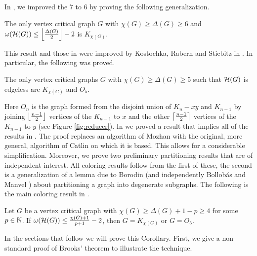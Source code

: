 In \cite{rabern2010a}, we improved the $7$ to $6$ by proving the following generalization.

\begin{thm}
The only vertex critical graph $G$ with $\chi(G) \geq \Delta(G) \geq 6$ and $\omega(\mathcal{H}(G)) \leq \left\lfloor\frac{\Delta(G)}{2}\right\rfloor - 2$ is $K_{\chi(G)}$.
\end{thm}

This result and those in \cite{rabern2010b} were improved by Kostochka, Rabern and Stiebitz in \cite{krs_one}.  In particular, the following was proved.

\begin{thm}\label{krs_one_main} The only vertex critical graphs $G$ with $\chi(G) \geq
\Delta(G) \geq 5$ such that $\mathcal{H}(G)$ is edgeless are $K_{\chi(G)}$ and $O_5$.
\end{thm}



Here $O_n$ is the graph formed from the disjoint union of $K_n - xy$ and
$K_{n-1}$ by joining $\left\lfloor\frac{n-1}{2}\right\rfloor$ vertices of the $K_{n-1}$ to $x$
and the other $\left\lceil\frac{n-1}{2}\right\rceil$ vertices of the $K_{n-1}$ to $y$ (see
Figure \ref{fig:reducer}). In \cite{rabern2012partitioning} we proved a result that implies all of the results in \cite{krs_one}. The proof replaces an algorithm of Mozhan \cite{mozhan1983} with the original, more general, algorithm of Catlin \cite{CatlinAnotherBound} on which it is based. This allows for a considerable simplification.   Moreover, we prove two preliminary partitioning results that are of independent interest.  
All coloring results follow from the first of these, the second is a generalization of a lemma due to Borodin \cite{borodin1976decomposition} (and independently Bollob\'as and Manvel \cite{bollobasManvel})
about partitioning a graph into degenerate subgraphs.  The following is the main
coloring result in \cite{rabern2012partitioning}.

\begin{cor}\label{MainShuffleColoringResult}
	Let $G$ be a vertex critical graph with $\chi(G) \geq \Delta(G) + 1 - p \geq 4$
	for some $p \in \mathbb{N}$.  If $\omega(\mathcal{H}(G)) \leq \frac{\chi(G) + 1}{p + 1} - 2$,
	then $G = K_{\chi(G)}$ or $G = O_5$.
\end{cor}

In the sections that follow we will prove this Corollary.  First, we give a
non-standard proof of Brooks' theorem to illustrate the technique.

